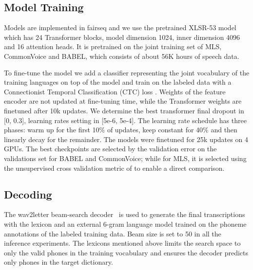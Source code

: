 \documentclass{article}
\newcommand{\ma}[1]{{\color{orange}#1}}
\begin{document}
\subsection{Model Training}
Models are implemented in fairseq \cite{ott2019fairseq} and we use the pretrained XLSR-53 model~\cite{conneau2020unsupervised} which has 24 Transformer blocks, model dimension 1024, inner dimension 4096 and 16 attention heads. 
It is pretrained on the joint training set of MLS, CommonVoice and BABEL, which consists of about 56K hours of speech data.

To fine-tune the model we add a classifier representing the joint vocabulary of the training languages on top of the model and train on the labeled data with a Connectionist
Temporal Classification (CTC) loss \cite{graves2006connectionist}. Weights of the feature encoder are not updated at fine-tuning time, while the Transformer weights are finetuned after 10k updates. We determine the best transformer final dropout in [0, 0.3], learning rates setting in [5e-6, 5e-4]. The learning rate schedule has three phases: warm up for the first 10\% of updates, keep constant for 40\% and then linearly decay for the remainder. The models were finetuned for 25k updates on 4 GPUs. The best checkpoints are selected by the validation error on the validations set for BABEL and CommonVoice; while for MLS, it is selected using the unsupervised cross validation metric of \cite{baevski2021unsupervised} to enable a direct comparison.



\subsection{Decoding}

The wav2letter beam-search decoder~\cite{pratap2019wav2letter++} is used to generate the final transcriptions with the lexicon and an external 6-gram language model trained on the phoneme annotations of the labeled training data.
Beam size is set to 50 in all the inference experiments. 
The lexicons mentioned above limits the search space to only the valid phones in the training vocabulary and ensures the decoder predicts only phones in the target dictionary.
\end{document}

